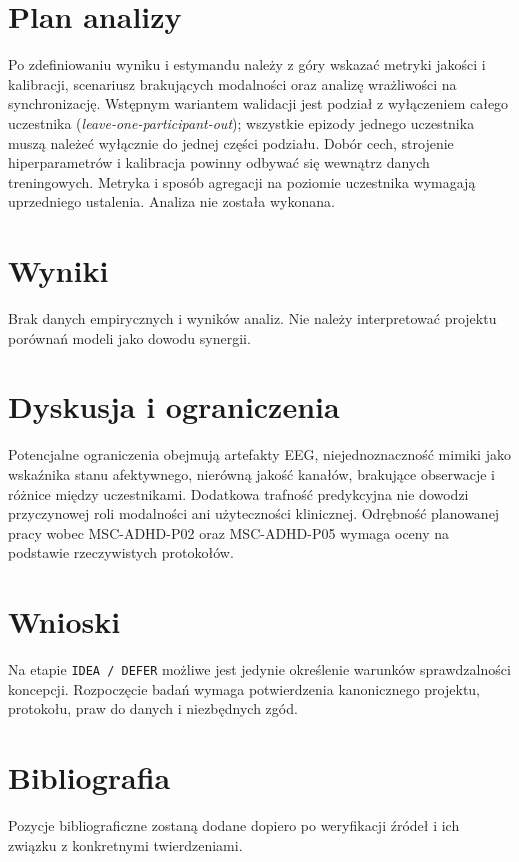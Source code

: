 \documentclass[11pt,a4paper]{article}
\begin{document}
\section{Plan analizy}
Po zdefiniowaniu wyniku i estymandu należy z góry wskazać metryki jakości i kalibracji, scenariusz brakujących modalności oraz analizę wrażliwości na synchronizację. Wstępnym wariantem walidacji jest podział z wyłączeniem całego uczestnika (\emph{leave-one-participant-out}); wszystkie epizody jednego uczestnika muszą należeć wyłącznie do jednej części podziału. Dobór cech, strojenie hiperparametrów i kalibracja powinny odbywać się wewnątrz danych treningowych. Metryka i sposób agregacji na poziomie uczestnika wymagają uprzedniego ustalenia. Analiza nie została wykonana.

\section{Wyniki}
Brak danych empirycznych i wyników analiz. Nie należy interpretować projektu porównań modeli jako dowodu synergii.

\section{Dyskusja i ograniczenia}
Potencjalne ograniczenia obejmują artefakty EEG, niejednoznaczność mimiki jako wskaźnika stanu afektywnego, nierówną jakość kanałów, brakujące obserwacje i różnice między uczestnikami. Dodatkowa trafność predykcyjna nie dowodzi przyczynowej roli modalności ani użyteczności klinicznej. Odrębność planowanej pracy wobec MSC-ADHD-P02 oraz MSC-ADHD-P05 wymaga oceny na podstawie rzeczywistych protokołów.

\section{Wnioski}
Na etapie \texttt{IDEA / DEFER} możliwe jest jedynie określenie warunków sprawdzalności koncepcji. Rozpoczęcie badań wymaga potwierdzenia kanonicznego projektu, protokołu, praw do danych i niezbędnych zgód.

\section*{Bibliografia}
Pozycje bibliograficzne zostaną dodane dopiero po weryfikacji źródeł i ich związku z konkretnymi twierdzeniami.
\end{document}
